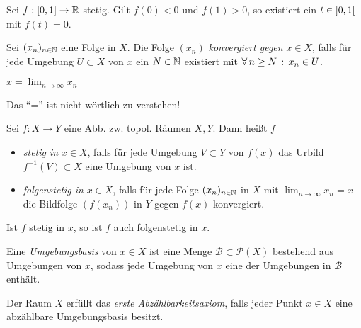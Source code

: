 \documentclass{cheat-sheet}
\begin{document}
\begin{prop}[ZWS]
  Sei $f : \left[ 0, 1 \right] \to \mathbb{R}$ stetig. Gilt $f(0) < 0$ und $f(1) > 0$, so existiert ein $t \in \left] 0, 1 \right[$ mit $f(t) = 0$.
\end{prop}


\begin{defn}
  Sei $(x_n)_{n \in \mathbb{N}}$ eine Folge in $X$. Die Folge $(x_n)$ \emph{konvergiert gegen} $x \in X$, falls für jede Umgebung $U \subset X$ von $x$ ein $N \in \mathbb{N}$ existiert mit $\forall \, {n \geq N} \,:\, x_n \in U$.
\end{defn}

\begin{nota}
  $x = \lim_{n \to \infty} x_n$
\end{nota}

\begin{acht}
  Das "`="' ist nicht wörtlich zu verstehen!
\end{acht}

\begin{defn}
  Sei $f : X {\to} Y$ eine Abb. zw. topol. Räumen $X, Y$. Dann heißt $f$
  \begin{itemize}
    \item \emph{stetig in} $x \in X$, falls für jede Umgebung $V \subset Y$ von $f(x)$ das Urbild $f^{-1}(V) \subset X$ eine Umgebung von $x$ ist.
    \item \emph{folgenstetig in} $x \in X$, falls für jede Folge $(x_n)_{n \in \mathbb{N}}$ in $X$ mit $\lim_{n\to\infty} x_n = x$ die Bildfolge $(f(x_n))$ in $Y$ gegen $f(x)$ konvergiert.
  \end{itemize}
\end{defn}

\begin{prop}
  Ist $f$ stetig in $x$, so ist $f$ auch folgenstetig in $x$.
\end{prop}

\begin{defn}
  Eine \emph{Umgebungsbasis} von $x \in X$ ist eine Menge $\mathcal{B} \subset \mathcal{P}(X)$ bestehend aus Umgebungen von $x$, sodass jede Umgebung von $x$ eine der Umgebungen in $\mathcal{B}$ enthält.
\end{defn}

\begin{defn}
  Der Raum $X$ erfüllt das \emph{erste Abzählbarkeitsaxiom}, falls jeder Punkt $x \in X$ eine abzählbare Umgebungsbasis besitzt.
\end{defn}
\end{document}
